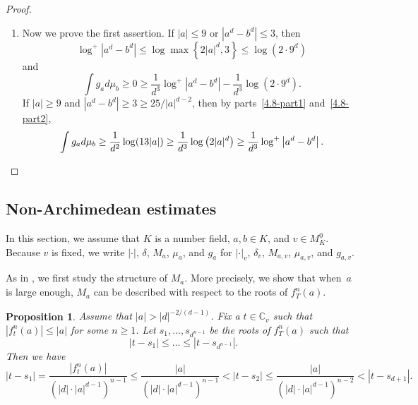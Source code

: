 \documentclass[11pt]{amsart}
\numberwithin{equation}{section}
\theoremstyle{plain}
\newtheorem{prop}[thm]{Proposition}
\theoremstyle{definition}
\theoremstyle{remark}
\newcommand{\C}{\mathbb C}
\begin{document}
\begin{proof}
\begin{enumerate}[wide]
\item\label{4.8-part3}
Now we prove the first assertion. If $|a|\leq9$ or $|a^{d}-b^{d}|\leq3$,
then
\[
\log^{+}\left|a^{d}-b^{d}\right|\leq\log\max\left\{2|a|^{d},3\right\}\leq\log\left(2\cdot9^{d}\right)
\]
and
\[
\int g_{a}d\mu_{b}\geq0\geq\frac{1}{d^{3}}\log^{+}\left|a^{d}-b^{d}\right|-\frac{1}{d^{3}}\log\left(2\cdot9^{d}\right).
\]
If $|a|\geq9$ and $|a^{d}-b^{d}|\geq3\geq25/|a|^{d-2}$, then by
parts~\eqref{4.8-part1} and~\eqref{4.8-part2},
\[
\int g_{a}d\mu_{b}\geq\frac{1}{d^{2}}\log(13|a|)\geq\frac{1}{d^{3}}\log\left(2|a|^{d}\right)\geq\frac{1}{d^{3}}\log^{+}\left|a^{d}-b^{d}\right|.\qedhere
\]
\end{enumerate}
\end{proof}

\subsection{Non-Archimedean estimates}\label{sec4.4}

In this section, we assume that $K$ is a number field, $a,b\in K$,
and $v\in M_{K}^{0}$. Because $v$ is fixed, we write $|\cdot|$,
$\delta$, $M_{a}$, $\mu_{a}$, and $g_{a}$ for $|\cdot|_{v}$,
$\delta_{v}$, $M_{a,v}$, $\mu_{a,v}$, and $g_{a,v}$.

As in \cite[Sections 5.1 and 6.1]{DKY2}, we first study the structure
of $M_{a}$. More precisely, we show that when~$a$ is large enough,
$M_{a}$ can be described with respect to the roots of $f_{T}^{n}(a)$.

\begin{prop}\label{prop4.9}
Assume that $|a|>|d|^{-2/(d-1)}$. Fix a $t\in\C_{v}$
such that $|f_{t}^{n}(a)|\leq|a|$ for some $n\geq1$. Let $s_{1},\dots,s_{d^{n-1}}$
be the roots of $f_{T}^{n}(a)$ such that
\[
|t-s_{1}|\leq\dots\leq|t-s_{d^{n-1}}|.
\]
Then we have
\[
|t-s_{1}|=\frac{\left|f_{t}^{n}(a)\right|}{\left(|d|\cdot|a|^{d-1}\right)^{n-1}}\leq\frac{|a|}{\left(|d|\cdot|a|^{d-1}\right)^{n-1}}<|t-s_{2}|\leq\frac{|a|}{\left(|d|\cdot|a|^{d-1}\right)^{n-2}}<|t-s_{d+1}|.
\]
\end{prop}
\end{document}
